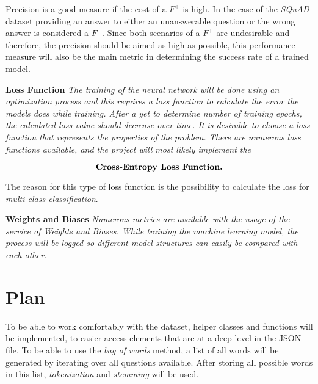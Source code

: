             Precision is a good measure if the cost of a $F^+$ is high. In the case of the \emph{SQuAD}-dataset providing an answer to either an unanswerable question or the wrong answer is considered a $F^+$.
            Since both scenarios of a $F^+$ are undesirable and therefore, the precision should be aimed as high as possible, this performance measure will also be the main metric in determining the success rate of a trained model.


        \begin{tcolorbox}
            \textbf{Loss Function}
            \textit{
                The training of the neural network will be done using an optimization process and this requires a loss function to calculate the error the models does while training.
                After a yet to determine number of training epochs, the calculated loss value should decrease over time.
                It is desirable to choose a loss function that represents the properties of the problem.
                There are numerous loss functions available, and the project will most likely implement the 
                }

                $$\text{\textbf{Cross-Entropy Loss Function.}}$$

                The reason for this type of loss function is the possibility to calculate the loss for \emph{multi-class classification}.
        \end{tcolorbox}

        \begin{tcolorbox}
            \textbf{Weights and Biases}
            \textit{
                Numerous metrics are available with the usage of the service of Weights and Biases.
                While training the machine learning model, the process will be logged so different model structures can easily be compared with each other.
                }
        \end{tcolorbox}
  
        

\section{Plan}
\label{sec:plan}
        To be able to work comfortably with the dataset, helper classes and functions will be implemented, to easier access elements that are at a deep level in the JSON-file.
        To be able to use the \emph{bag of words} method, a list of all words will be generated by iterating over all questions available.
        After storing all possible words in this list, \emph{tokenization} and \emph{stemming} will be used.

